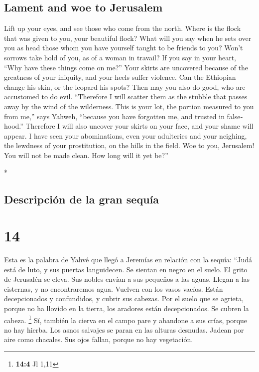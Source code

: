 \begin{paracol}{2}
\begin{otherlanguage}{english}
\hypertarget{lament-and-woe-to-jerusalem}{%
\subsection{Lament and woe to
Jerusalem}\label{lament-and-woe-to-jerusalem}}

 Lift up your eyes, and see those who come from the
north. Where is the flock that was given to you, your beautiful flock?
 What will you say when he sets over you as head those
whom you have yourself taught to be friends to you? Won't sorrows take
hold of you, as of a woman in travail?  If you say in
your heart, ``Why have these things come on me?'' Your skirts are
uncovered because of the greatness of your iniquity, and your heels
suffer violence.  Can the Ethiopian change his skin, or
the leopard his spots? Then may you also do good, who are accustomed to
do evil.  ``Therefore I will scatter them as the stubble
that passes away by the wind of the wilderness.  This is
your lot, the portion measured to you from me,'' says Yahweh, ``because
you have forgotten me, and trusted in falsehood.'' 
Therefore I will also uncover your skirts on your face, and your shame
will appear.  I have seen your abominations, even your
adulteries and your neighing, the lewdness of your prostitution, on the
hills in the field. Woe to you, Jerusalem! You will not be made clean.
How long will it yet be?''

\end{otherlanguage}

\switchcolumn[0]*

\hypertarget{descripciuxf3n-de-la-gran-sequuxeda}{%
\subsection{Descripción de la gran
sequía}\label{descripciuxf3n-de-la-gran-sequuxeda}}

\hypertarget{section-26}{%
\section{14}\label{section-26}}

 Esta es la palabra de Yahvé que llegó a Jeremías en
relación con la sequía:  ``Judá está de luto, y sus
puertas languidecen. Se sientan en negro en el suelo. El grito de
Jerusalén se eleva.  Sus nobles envían a sus pequeños a
las aguas. Llegan a las cisternas, y no encontraremos agua. Vuelven con
los vasos vacíos. Están decepcionados y confundidos, y cubrir sus
cabezas.  Por el suelo que se agrieta, porque no ha
llovido en la tierra, los aradores están decepcionados. Se cubren la
cabeza. \footnote{\textbf{14:4} Jl 1,11}  Sí, también la
cierva en el campo pare y abandone a sus crías, porque no hay hierba.
 Los asnos salvajes se paran en las alturas desnudas.
Jadean por aire como chacales. Sus ojos fallan, porque no hay
vegetación.


\end{paracol}
